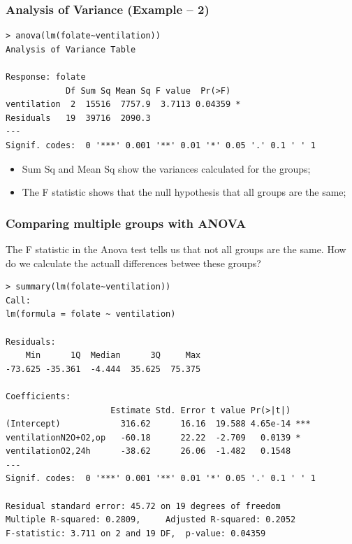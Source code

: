 \documentclass[10pt]{beamer}
\begin{document}
\begin{frame}
  \frametitle{Analysis of Variance (Example -- 2)}

  \begin{block}{}
{\small
\begin{verbatim}
> anova(lm(folate~ventilation))
Analysis of Variance Table

Response: folate
            Df Sum Sq Mean Sq F value  Pr(>F)  
ventilation  2  15516  7757.9  3.7113 0.04359 *
Residuals   19  39716  2090.3                  
---
Signif. codes:  0 '***' 0.001 '**' 0.01 '*' 0.05 '.' 0.1 ' ' 1
\end{verbatim}}
  \end{block}
\begin{itemize}
  \item Sum Sq and Mean Sq show the variances calculated for the
    groups;
  \item The F statistic shows that the null hypothesis that all groups
    are the same;
\end{itemize}
\end{frame}

\begin{frame}
  \frametitle{Comparing multiple groups with ANOVA} 
{\smaller
  The F statistic in the Anova test tells us that not all groups are
  the same. How do we calculate the actuall differences betwee these
  groups?

  \begin{block}{}
\begin{verbatim}
> summary(lm(folate~ventilation))
Call:
lm(formula = folate ~ ventilation)

Residuals:
    Min      1Q  Median      3Q     Max 
-73.625 -35.361  -4.444  35.625  75.375 

Coefficients:
                     Estimate Std. Error t value Pr(>|t|)    
(Intercept)            316.62      16.16  19.588 4.65e-14 ***
ventilationN2O+O2,op   -60.18      22.22  -2.709   0.0139 *  
ventilationO2,24h      -38.62      26.06  -1.482   0.1548    
---
Signif. codes:  0 '***' 0.001 '**' 0.01 '*' 0.05 '.' 0.1 ' ' 1 

Residual standard error: 45.72 on 19 degrees of freedom
Multiple R-squared: 0.2809,     Adjusted R-squared: 0.2052 
F-statistic: 3.711 on 2 and 19 DF,  p-value: 0.04359
\end{verbatim}
  \end{block}}
\end{frame}
\end{document}
